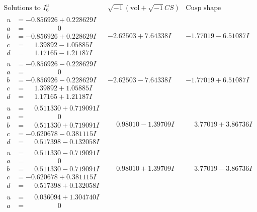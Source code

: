 \documentclass[1p]{elsarticle_modified}
\theoremstyle{definition}
\newcommand{\I}{\sqrt{-1}}
\begin{document}
$$\begin{array}{c|c|c}  
\text{Solutions to }I^u_{6}& \I (\text{vol} + \sqrt{-1}CS) & \text{Cusp shape}\\
 \hline 
\begin{aligned}
u &= -0.856926 + 0.228629 I \\
a &= \phantom{-0.000000 } 0 \\
b &= -0.856926 + 0.228629 I \\
c &= \phantom{-}1.39892 - 1.05885 I \\
d &= \phantom{-}1.17165 - 1.21187 I\end{aligned}
 & -2.62503 + 7.64338 I & -1.77019 - 6.51087 I \\ \hline\begin{aligned}
u &= -0.856926 - 0.228629 I \\
a &= \phantom{-0.000000 } 0 \\
b &= -0.856926 - 0.228629 I \\
c &= \phantom{-}1.39892 + 1.05885 I \\
d &= \phantom{-}1.17165 + 1.21187 I\end{aligned}
 & -2.62503 - 7.64338 I & -1.77019 + 6.51087 I \\ \hline\begin{aligned}
u &= \phantom{-}0.511330 + 0.719091 I \\
a &= \phantom{-0.000000 } 0 \\
b &= \phantom{-}0.511330 + 0.719091 I \\
c &= -0.620678 - 0.381115 I \\
d &= \phantom{-}0.517398 - 0.132058 I\end{aligned}
 & \phantom{-}0.98010 - 1.39709 I & \phantom{-}3.77019 + 3.86736 I \\ \hline\begin{aligned}
u &= \phantom{-}0.511330 - 0.719091 I \\
a &= \phantom{-0.000000 } 0 \\
b &= \phantom{-}0.511330 - 0.719091 I \\
c &= -0.620678 + 0.381115 I \\
d &= \phantom{-}0.517398 + 0.132058 I\end{aligned}
 & \phantom{-}0.98010 + 1.39709 I & \phantom{-}3.77019 - 3.86736 I \\ \hline\begin{aligned}
u &= \phantom{-}0.036094 + 1.304740 I \\
a &= \phantom{-0.000000 } 0 \\

\end{aligned}
\end{array}$$
\end{document}
